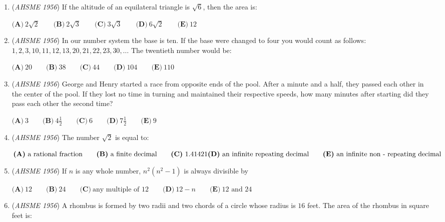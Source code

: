 \begin{enumerate}
 $\textbf{(A)}\ \text{a straight line}\qquad \textbf{(B)}\ \text{an equilateral triangle}\qquad \textbf{(C)}\ \text{a parallelogram} \\ \textbf{(D)}\ \text{a rectangle} \qquad \textbf{(E)}\ \text{a square}$


	\item (\textit{AHSME 1956}) If the altitude of an equilateral triangle is $\sqrt {6}$, then the area is: 


 $\textbf{(A)}\ 2\sqrt{2}\qquad\textbf{(B)}\ 2\sqrt{3}\qquad\textbf{(C)}\ 3\sqrt{3}\qquad\textbf{(D)}\ 6\sqrt{2}\qquad\textbf{(E)}\ 12$


	\item (\textit{AHSME 1956}) In our number system the base is ten. If the base were changed to four you would count as follows: 
$1,2,3,10,11,12,13,20,21,22,23,30,\ldots$ The twentieth number would be: 


 $\textbf{(A)}\ 20 \qquad\textbf{(B)}\ 38 \qquad\textbf{(C)}\ 44 \qquad\textbf{(D)}\ 104 \qquad\textbf{(E)}\ 110$


	\item (\textit{AHSME 1956}) George and Henry started a race from opposite ends of the pool. After a minute and a half, 
they passed each other in the center of the pool. If they lost no time in turning and 
maintained their respective speeds, how many minutes after starting did they pass each other the second time? 


 $\textbf{(A)}\ 3\qquad \textbf{(B)}\ 4\frac{1}{2}\qquad \textbf{(C)}\ 6\qquad \textbf{(D)}\ 7\frac{1}{2}\qquad \textbf{(E)}\ 9$


	\item (\textit{AHSME 1956}) The number $\sqrt {2}$ is equal to: 


 $\textbf{(A)}\ \text{a rational fraction} \qquad \textbf{(B)}\ \text{a finite decimal} \qquad \textbf{(C)}\ 1.41421 \\ \textbf{(D)}\ \text{an infinite repeating decimal} \qquad \textbf{(E)}\ \text{an infinite non - repeating decimal}$


	\item (\textit{AHSME 1956}) If $n$ is any whole number, $n^2(n^2 - 1)$ is always divisible by 


 $\textbf{(A)}\ 12\qquad \textbf{(B)}\ 24\qquad \textbf{(C)}\ \text{any multiple of }12\qquad \textbf{(D)}\ 12-n\qquad \textbf{(E)}\ 12\text{ and }24$


	\item (\textit{AHSME 1956}) A rhombus is formed by two radii and two chords of a circle whose radius is $16$ feet. The area of the rhombus in square feet is: 



\end{enumerate}
